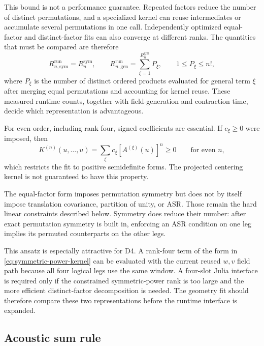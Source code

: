 \documentclass{article}
\begin{document}
This bound is not a performance guarantee. Repeated factors reduce the
number of distinct permutations, and a specialized kernel can reuse
intermediates or accumulate several permutations in one call. Independently
optimized equal-factor and distinct-factor fits can also converge at
different ranks. The quantities that must be compared are therefore
\begin{equation}
    R_{n,\mathrm{sym}}^{\mathrm{run}}
    =
    R_n^{\mathrm{sym}},
    \qquad
    R_{n,\mathrm{gen}}^{\mathrm{run}}
    =
    \sum_{\xi=1}^{R_n^{\mathrm{gen}}}P_\xi,
    \qquad 1\leq P_\xi\leq n!,
    \label{eq:runtime-term-counts}
\end{equation}
where $P_\xi$ is the number of distinct ordered products evaluated
for general term $\xi$ after merging equal permutations and accounting for
kernel reuse. These measured runtime counts, together with field-generation
and contraction time, decide which representation is advantageous.

For even order, including rank four, signed coefficients are essential. If
$c_\xi\geq0$ were imposed, then
\begin{equation}
    K^{(n)}(u,\ldots,u)
    =
    \sum_\xi c_\xi
    [A^{(\xi)}(u)]^n
    \geq0
    \qquad\text{for even }n,
    \label{eq:positive-power-restriction}
\end{equation}
which restricts the fit to positive semidefinite forms. The projected
centering kernel is not guaranteed to have this property.

The equal-factor form imposes permutation symmetry but does not by itself
impose translation covariance, partition of unity, or ASR. Those remain
the hard linear constraints described below. Symmetry does reduce their
number: after exact permutation symmetry is built in, enforcing an ASR
condition on one leg implies its permuted counterparts on the other legs.

This ansatz is especially attractive for D4. A rank-four term of the form
in \autoref{eq:symmetric-power-kernel} can be evaluated with the current
reused $w,v$ field path because all four logical legs use the same window.
A four-slot Julia interface is required only if the constrained
symmetric-power rank is too large and the more efficient distinct-factor
decomposition is needed. The geometry fit should therefore compare these
two representations before the runtime interface is expanded.


\subsection{Acoustic sum rule}
\label{sec:asr}
\end{document}
